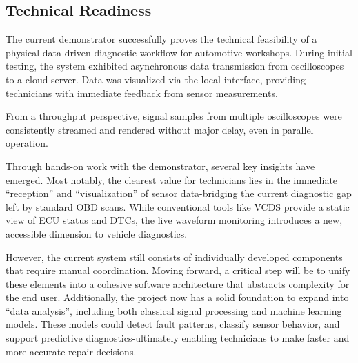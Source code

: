\subsection{Technical Readiness}
The current demonstrator successfully proves the technical feasibility of a physical data driven diagnostic workflow for automotive workshops. 
During initial testing, the system exhibited asynchronous data transmission from oscilloscopes to a cloud server.
Data was visualized via the local interface, providing technicians with immediate feedback from sensor measurements.

From a throughput perspective, signal samples from multiple oscilloscopes were consistently streamed and rendered without major delay, even in parallel operation. 

Through hands-on work with the demonstrator, several key insights have emerged. 
Most notably, the clearest value for technicians lies in the immediate ``reception'' and ``visualization'' of sensor data-bridging the current diagnostic gap left by standard OBD scans. 
While conventional tools like VCDS provide a static view of ECU status and DTCs, the live waveform monitoring introduces a new, accessible dimension to vehicle diagnostics.

However, the current system still consists of individually developed components that require manual coordination. 
Moving forward, a critical step will be to unify these elements into a cohesive software architecture that abstracts complexity for the end user. 
Additionally, the project now has a solid foundation to expand into ``data analysis'', including both classical signal processing and machine learning models. 
These models could detect fault patterns, classify sensor behavior, and support predictive diagnostics-ultimately enabling technicians to make faster and more accurate repair decisions.



